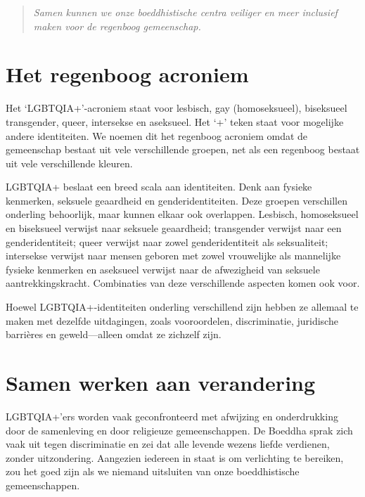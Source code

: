 \documentclass[12pt,openany]{book}
\begin{document}
\begin{quote}
\textit{Samen kunnen we onze boeddhistische centra veiliger en meer inclusief maken voor de regenboog gemeenschap.}
\end{quote}

\section*{Het regenboog acroniem}

Het ‘LGBTQIA+’-acroniem staat voor lesbisch, gay (homoseksueel), biseksueel transgender, queer, intersekse en aseksueel. Het ‘+’ teken staat voor mogelijke andere identiteiten. We noemen dit het regenboog acroniem omdat de gemeenschap bestaat uit vele verschillende groepen, net als een regenboog bestaat uit vele verschillende kleuren. 

LGBTQIA+ beslaat een breed scala aan identiteiten. Denk aan fysieke kenmerken, seksuele geaardheid en genderidentiteiten. Deze groepen verschillen onderling behoorlijk, maar kunnen elkaar ook overlappen. Lesbisch, homoseksueel en biseksueel verwijst naar seksuele geaardheid; transgender verwijst naar een genderidentiteit; queer verwijst naar zowel genderidentiteit als seksualiteit; intersekse verwijst naar mensen geboren met zowel vrouwelijke als mannelijke fysieke kenmerken en aseksueel verwijst naar de afwezigheid van seksuele aantrekkingskracht. Combinaties van deze verschillende aspecten komen ook voor. 

Hoewel LGBTQIA+-identiteiten onderling verschillend zijn hebben ze allemaal te maken met dezelfde uitdagingen, zoals vooroordelen, discriminatie, juridische barrières en geweld—alleen omdat ze zichzelf zijn.

\section*{Samen werken aan verandering}

LGBTQIA+’ers worden vaak geconfronteerd met afwijzing en onderdrukking door de samenleving en door religieuze gemeenschappen. De Boeddha  sprak zich vaak uit tegen discriminatie en zei dat alle levende wezens liefde verdienen, zonder uitzondering. Aangezien iedereen in staat is om verlichting te bereiken, zou het goed zijn als we niemand uitsluiten van onze boeddhistische gemeenschappen.  
\end{document}
